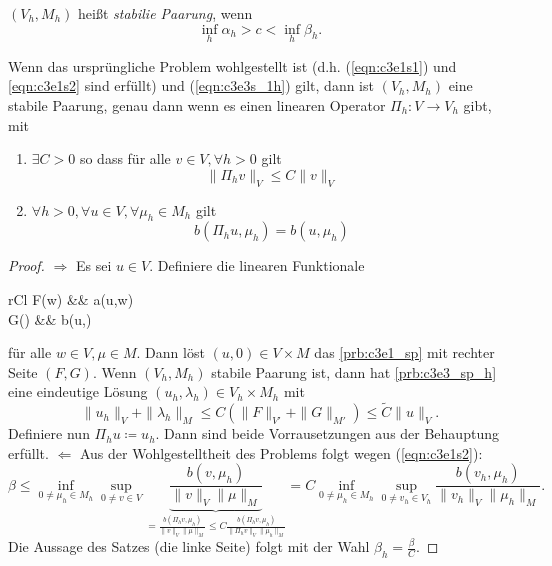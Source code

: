 \documentclass[../skript.tex]{subfiles}
\begin{document}
\begin{definition*}
	$(V_h,M_h)$ heißt \emph{stabilie Paarung}, wenn
	\[
		\inf_h\alpha_h > c < \inf_h\beta_h.
	\]
\end{definition*}

\begin{theorem}\label{thm:c3e3s3}
	Wenn das ursprüngliche Problem wohlgestellt ist (d.h. (\ref{eqn:c3e1s1}) und \ref{eqn:c3e1s2} sind erfüllt) und (\ref{eqn:c3e3s_1h}) gilt, dann ist $(V_h,M_h)$ eine stabile Paarung, genau dann wenn es einen linearen Operator $\Pi_h:V\to V_h$ gibt, mit
	\begin{enumerate}
		\item $\exists C>0$ so dass für alle $v\in V,\forall h>0$ gilt
				\[
					\|\Pi_h v\|_V\leq C\|v\|_V
				\]
		\item $\forall h>0,\forall u\in V,\forall\mu_h\in M_h$ gilt
				\[
					b(\Pi_h u,\mu_h) = b(u,\mu_h)
				\]
	\end{enumerate}
\end{theorem}

\begin{proof}
	\textbf{$\Rightarrow$  }
	Es sei $u\in V$. Definiere die linearen Funktionale 
	\begin{IEEEeqnarray*}{rCl}
		F(w) &\coloneqq& a(u,w) \\
		G(\mu) &\coloneqq& b(u,\mu)
	\end{IEEEeqnarray*}
	für alle $w\in V,\mu\in M$. Dann löst $(u,0)\in V\times M$ das \cref{prb:c3e1_sp} mit rechter Seite $(F,G)$. Wenn $(V_h,M_h)$ stabile Paarung ist, dann hat \cref{prb:c3e3_sp_h} eine eindeutige Lösung $(u_h,\lambda_h)\in V_h\times M_h$ mit
	\[
		\|u_h\|_{V} + \|\lambda_h\|_{M}\leq C\left( \|F\|_{V'} + \|G\|_{M'} \right) \leq \tilde{C}\|u\|_V.
	\]
	Definiere nun
	$\Pi_h u\coloneqq u_h$. Dann sind beide Vorrausetzungen aus der Behauptung erfüllt.\newline\newline\noindent
	\textbf{$\Leftarrow$  } Aus der Wohlgestelltheit des Problems folgt wegen (\ref{eqn:c3e1s2}):
	\[
		\beta \leq \inf_{0\not=\mu_h\in M_h}\sup_{0\not=v\in V}\underbrace{\frac{b(v,\mu_h)}{\|v\|_V\|\mu\|_M}}_{=\frac{b(\Pi_hv,\mu_h)}{\|v\|_V\|\mu\|_M} \leq C\frac{b(\Pi_h v,\mu_h)}{\|\Pi_h v\|_V\|\mu_h\|_M}}
		=  C\inf_{0\not=\mu_h\in M_h}\sup_{0\not=v_h\in V_h} \frac{b(v_h,\mu_h)}{\|v_h\|_V\|\mu_h\|_M}.
	\]
	Die Aussage des Satzes (die linke Seite) folgt mit der Wahl $\beta_h = \frac{\beta}{C}$.
\end{proof}
\end{document}
